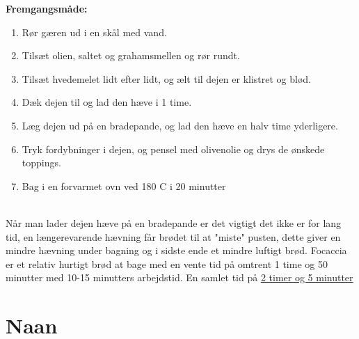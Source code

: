\documentclass{book}
\begin{document}
\begin{minipage}[t]{0.5\textwidth}
\textbf{Fremgangsmåde:}
\begin{enumerate}
    \item Rør gæren ud i en skål med vand.
    \item Tilsæt olien, saltet og grahamsmellen og rør rundt.
    \item Tilsæt hvedemelet lidt efter lidt, og ælt til dejen er klistret og blød.
    \item Dæk dejen til og lad den hæve i 1 time.
    \item Læg dejen ud på en bradepande, og lad den hæve en halv time yderligere.
    \item Tryk fordybninger i dejen, og pensel med olivenolie og drys de ønskede toppings.
    \item Bag i en forvarmet ovn ved 180 \degree C i 20 minutter
\end{enumerate}
\end{minipage}
\\ Når man lader dejen hæve på en bradepande er det vigtigt det ikke er for lang tid, en længerevarende hævning får brødet til at "miste" pusten, dette giver en mindre hævning under bagning og i sidste ende et mindre luftigt brød. 
Focaccia er et relativ hurtigt brød at bage med en vente tid på omtrent 1 time og 50 minutter med 10-15 minutters arbejdstid. En samlet tid på \underline{2 timer og 5 minutter}
\newpage {}
\newpage \section{Naan}
\end{document}
